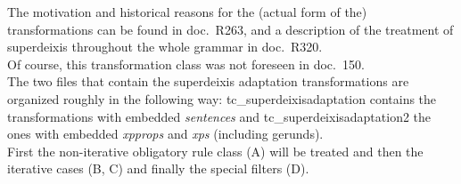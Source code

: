 \begin{description}
The motivation and historical reasons for the (actual form of the) 
transformations can be found in doc.\ R263, and a description of the treatment 
of superdeixis throughout the whole grammar in doc.\ R320.\\
Of course, this transformation class was not foreseen in doc.\ 150.\\

The two files that contain the superdeixis adaptation transformations are 
organized roughly in the following way: tc\_superdeixisadaptation contains the 
transformations with embedded {\em sentences} and tc\_superdeixisadaptation2 
the ones with embedded {\em xpprops\/} and {\em xps\/} (including gerunds).\\
First the non-iterative obligatory rule class (A) will be treated and then the 
iterative cases (B, C) and finally the special filters (D).


\end{description}

